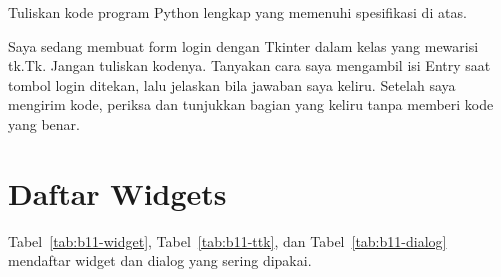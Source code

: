 \begin{enumerate}
\begin{enumerate}
  \end{enumerate}
  Tuliskan kode program Python lengkap yang memenuhi spesifikasi di atas.
  \begin{promptterarah}
  Saya sedang membuat form login dengan Tkinter dalam kelas yang mewarisi tk.Tk. Jangan tuliskan kodenya. Tanyakan cara saya mengambil isi Entry saat tombol login ditekan, lalu jelaskan bila jawaban saya keliru. Setelah saya mengirim kode, periksa dan tunjukkan bagian yang keliru tanpa memberi kode yang benar.
  \end{promptterarah}
\end{enumerate}

\section{Daftar Widgets}

Tabel~\ref{tab:b11-widget}, Tabel~\ref{tab:b11-ttk}, dan Tabel~\ref{tab:b11-dialog} mendaftar widget dan dialog yang sering dipakai.

